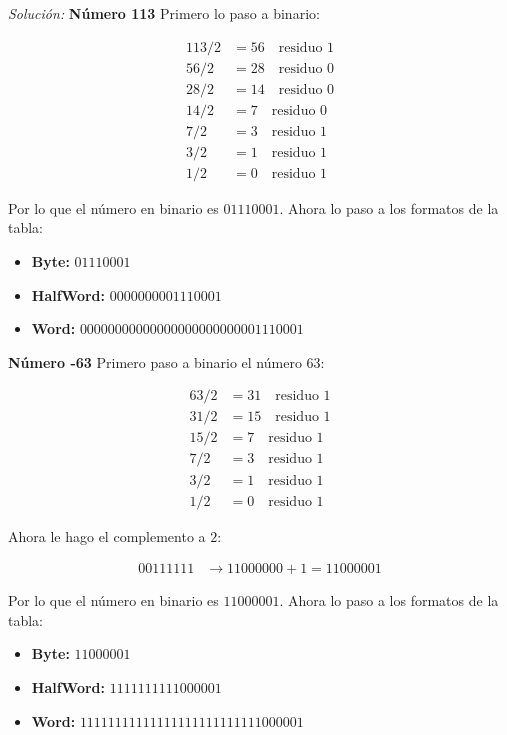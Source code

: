 \documentclass{article}
\newenvironment{solution}
    {\textit{Solución:}}
    {}
\begin{document}
\begin{solution}
\textbf{Número 113}
Primero lo paso a binario:

\begin{align*}
    113/2 &= 56 \quad \text{residuo } 1\\
    56/2 &= 28 \quad \text{residuo } 0\\
    28/2 &= 14 \quad \text{residuo } 0\\
    14/2 &= 7 \quad \text{residuo } 0\\
    7/2 &= 3 \quad \text{residuo } 1\\
    3/2 &= 1 \quad \text{residuo } 1\\
    1/2 &= 0 \quad \text{residuo } 1
\end{align*}

Por lo que el número en binario es $01110001$. Ahora lo paso a los formatos de la tabla:

\begin{itemize}
    \item \textbf{Byte:} $01110001$
    \item \textbf{HalfWord:} $0000000001110001$
    \item \textbf{Word:} $00000000000000000000000001110001$
\end{itemize}

\textbf{Número -63}
Primero paso a binario el número $63$:

\begin{align*}
    63/2 &= 31 \quad \text{residuo } 1\\
    31/2 &= 15 \quad \text{residuo } 1\\
    15/2 &= 7 \quad \text{residuo } 1\\
    7/2 &= 3 \quad \text{residuo } 1\\
    3/2 &= 1 \quad \text{residuo } 1\\
    1/2 &= 0 \quad \text{residuo } 1
\end{align*}

Ahora le hago el complemento a $2$:

\begin{align*}
    00111111 &\rightarrow 11000000 + 1 = 11000001
\end{align*}

Por lo que el número en binario es $11000001$. Ahora lo paso a los formatos de la tabla:

\begin{itemize}
    \item \textbf{Byte:} $11000001$
    \item \textbf{HalfWord:} $1111111111000001$
    \item \textbf{Word:} $11111111111111111111111111000001$
\end{itemize}


\end{solution}
\end{document}
